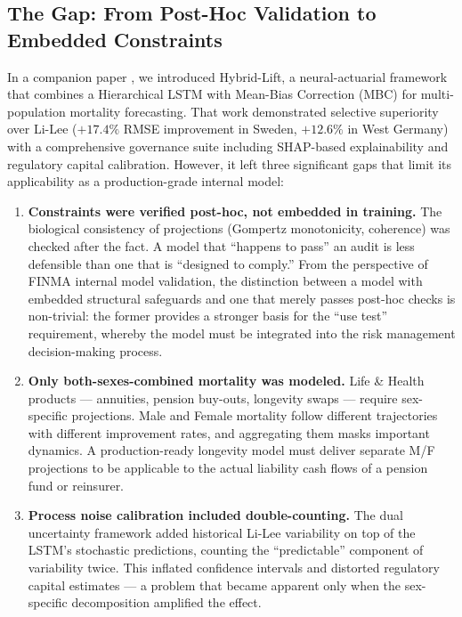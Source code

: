 \documentclass[11pt,a4paper]{article}
\begin{document}
\subsection{The Gap: From Post-Hoc Validation to Embedded Constraints}

In a companion paper \cite{rindori2026p04}, we introduced Hybrid-Lift, a neural-actuarial framework that combines a Hierarchical LSTM with Mean-Bias Correction (MBC) for multi-population mortality forecasting. That work demonstrated selective superiority over Li-Lee ($+17.4\%$ RMSE improvement in Sweden, $+12.6\%$ in West Germany) with a comprehensive governance suite including SHAP-based explainability and regulatory capital calibration. However, it left three significant gaps that limit its applicability as a production-grade internal model:

\begin{enumerate}
    \item \textbf{Constraints were verified post-hoc, not embedded in training.} The biological consistency of projections (Gompertz monotonicity, coherence) was checked after the fact. A model that ``happens to pass'' an audit is less defensible than one that is ``designed to comply.'' From the perspective of FINMA internal model validation, the distinction between a model with embedded structural safeguards and one that merely passes post-hoc checks is non-trivial: the former provides a stronger basis for the ``use test'' requirement, whereby the model must be integrated into the risk management decision-making process.
    \item \textbf{Only both-sexes-combined mortality was modeled.} Life \& Health products --- annuities, pension buy-outs, longevity swaps --- require sex-specific projections. Male and Female mortality follow different trajectories with different improvement rates, and aggregating them masks important dynamics. A production-ready longevity model must deliver separate M/F projections to be applicable to the actual liability cash flows of a pension fund or reinsurer.
    \item \textbf{Process noise calibration included double-counting.} The dual uncertainty framework added historical Li-Lee variability on top of the LSTM's stochastic predictions, counting the ``predictable'' component of variability twice. This inflated confidence intervals and distorted regulatory capital estimates --- a problem that became apparent only when the sex-specific decomposition amplified the effect.
\end{enumerate}
\end{document}
